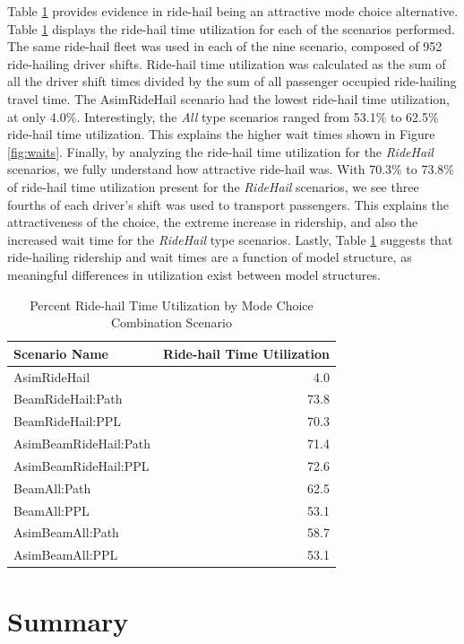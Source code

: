 \documentclass[simple, masters, twoside]{byuthesis}
\begin{document}
Table \ref{tab:timeutil} provides evidence in ride-hail being an attractive mode choice alternative. Table \ref{tab:timeutil} displays the ride-hail time utilization for each of the scenarios performed. The same ride-hail fleet was used in each of the nine scenario, composed of 952 ride-hailing driver shifts. Ride-hail time utilization was calculated as the sum of all the driver shift times divided by the sum of all passenger occupied ride-hailing travel time. The AsimRideHail scenario had the lowest ride-hail time utilization, at only 4.0\%. Interestingly, the \emph{All} type scenarios ranged from 53.1\% to 62.5\% ride-hail time utilization. This explains the higher wait times shown in Figure \ref{fig:waits}. Finally, by analyzing the ride-hail time utilization for the \emph{RideHail} scenarios, we fully understand how attractive ride-hail was. With 70.3\% to 73.8\% of ride-hail time utilization present for the \emph{RideHail} scenarios, we see three fourths of each driver's shift was used to transport passengers. This explains the attractiveness of the choice, the extreme increase in ridership, and also the increased wait time for the \emph{RideHail} type scenarios. Lastly, Table \ref{tab:timeutil} suggests that ride-hailing ridership and wait times are a function of model structure, as meaningful differences in utilization exist between model structures.

\begin{table}

\caption[Percent Ride-hail Time Utilization]{\label{tab:timeutil}Percent Ride-hail Time Utilization by Mode Choice Combination Scenario}
\centering
\begin{tabular}[t]{lr}
\toprule
Scenario Name & Ride-hail Time Utilization\\
\midrule
AsimRideHail & 4.0\\
BeamRideHail:Path & 73.8\\
BeamRideHail:PPL & 70.3\\
AsimBeamRideHail:Path & 71.4\\
AsimBeamRideHail:PPL & 72.6\\
\addlinespace
BeamAll:Path & 62.5\\
BeamAll:PPL & 53.1\\
AsimBeamAll:Path & 58.7\\
AsimBeamAll:PPL & 53.1\\
\bottomrule
\end{tabular}
\end{table}

\hypertarget{summary-2}{%
\section{Summary}\label{summary-2}}
\end{document}
